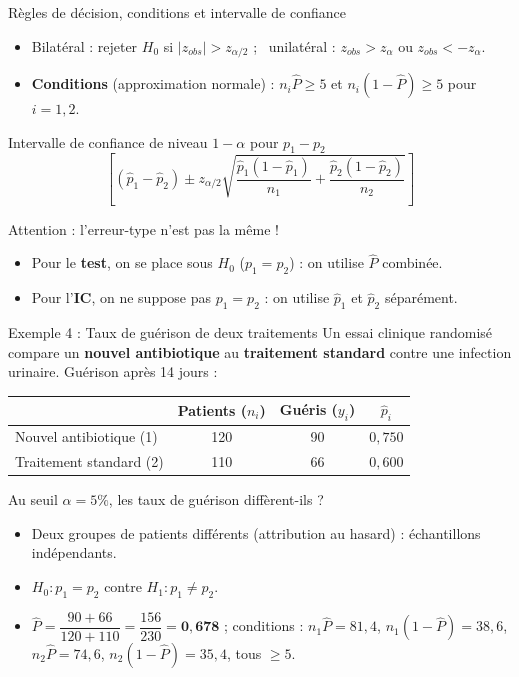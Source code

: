 \documentclass{BeamerTemplate}
\begin{document}
\begin{frame}[t]{Règles de décision, conditions et intervalle de confiance}
  \begin{itemize}\itemsep 1.5mm
    \item Bilatéral : rejeter $H_0$ si $|z_{obs}| > z_{\alpha/2}$ ; \ unilatéral : $z_{obs} > z_\alpha$ ou $z_{obs} < -z_\alpha$.
    \item \textbf{Conditions} (approximation normale) : $n_i \widehat{P} \ge 5$ et $n_i(1 - \widehat{P}) \ge 5$ pour $i = 1, 2$.
  \end{itemize}

  \begin{Boite}{Intervalle de confiance de niveau $1-\alpha$ pour $p_1 - p_2$}
    \[
      \left[ (\hat{p}_1 - \hat{p}_2) \pm z_{\alpha/2} \sqrt{\frac{\hat{p}_1(1-\hat{p}_1)}{n_1} + \frac{\hat{p}_2(1-\hat{p}_2)}{n_2}} \right]
    \]
  \end{Boite}

  \pause
  \alert{Attention :} l'erreur-type n'est pas la même !
  \begin{itemize}\itemsep 1.5mm
    \item Pour le \textbf{test}, on se place sous $H_0$ ($p_1 = p_2$) : on utilise $\widehat{P}$ combinée.
    \item Pour l'\textbf{IC}, on ne suppose pas $p_1 = p_2$ : on utilise $\hat{p}_1$ et $\hat{p}_2$ séparément.
  \end{itemize}
\end{frame}

\begin{frame}[t]{Exemple 4 : Taux de guérison de deux traitements}
  Un essai clinique randomisé compare un \textbf{nouvel antibiotique} au \textbf{traitement standard} contre une infection urinaire. Guérison après 14 jours :

  \medskip
  \centering
  \small
  \begin{tabular}{lccc}\toprule
    & Patients ($n_i$) & Guéris ($y_i$) & $\hat{p}_i$ \\ \midrule
    Nouvel antibiotique (1) & 120 & 90 & $0{,}750$ \\
    Traitement standard (2) & 110 & 66 & $0{,}600$ \\ \bottomrule
  \end{tabular}

  \raggedright
  \bigskip
  Au seuil $\alpha = 5\%$, les taux de guérison diffèrent-ils ?

  \medskip
  \begin{itemize}\itemsep 2mm
    \item<2-> Deux groupes de patients \alert{différents} (attribution au hasard) : échantillons indépendants.
    \item<2-> $H_0: p_1 = p_2$ contre $H_1: p_1 \ne p_2$.
    \item<2-> $\widehat{P} = \dfrac{90 + 66}{120 + 110} = \dfrac{156}{230} = \mathbf{0{,}678}$ ;
      conditions : $n_1\widehat{P} = 81{,}4$, $n_1(1-\widehat{P}) = 38{,}6$, $n_2\widehat{P} = 74{,}6$, $n_2(1-\widehat{P}) = 35{,}4$, tous $\ge 5$.
  \end{itemize}
\end{frame}
\end{document}
